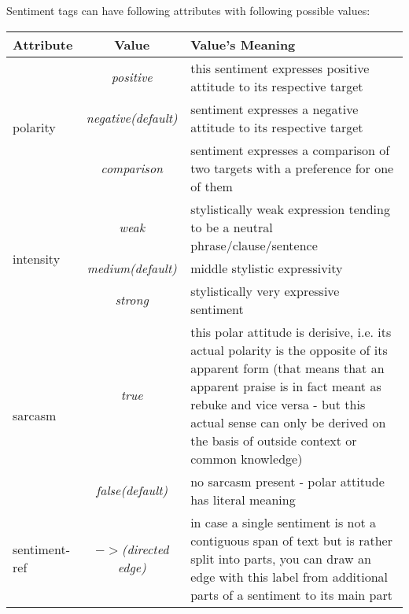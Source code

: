\documentclass[11pt,a4paper]{article}
\newlength\clmnwidth
\begin{document}
Sentiment tags can have following attributes with following possible
values:\\
\begin{tabular}[t]{|l|c|p{\clmnwidth}|}\hline
  Attribute & Value & Value's Meaning\\\hline

  \multirow{3}{*}{polarity} & \textit{positive} & this sentiment
  expresses positive attitude to its respective target\\\cline{2-3}

  & \textit{negative\newline(default)} & sentiment
  expresses a negative attitude to its respective target\\\cline{2-3}

  & \textit{comparison} & sentiment expresses a comparison of two
  targets with a preference for one of them\\\hline

  \multirow{3}{*}{intensity} & \textit{weak} & stylistically weak
  expression tending to be a neutral phrase/clause/sentence\\\cline{2-3}

  & \textit{medium\newline(default)} & middle stylistic
  expressivity\\\cline{2-3}

  & \textit{strong} & stylistically very expressive sentiment\\\hline

  \multirow{2}{*}{sarcasm} & \textit{true} & this polar attitude is
  derisive, i.e. its actual polarity is the opposite of its apparent
  form (that means that an apparent praise is in fact meant as rebuke
  and vice versa - but this actual sense can only be derived on the
  basis of outside context or common knowledge)\\\cline{2-3}

  & \textit{false\newline(default)} & no sarcasm present - polar
  attitude has literal meaning\\\hline

  sentiment-ref & \textit{$->$\newline(directed edge)} & in case a
  single sentiment is not a contiguous span of text but is rather split into
  parts, you can draw an edge with this label from additional parts of
  a sentiment to its main part\\\hline
\end{tabular}
\end{document}
